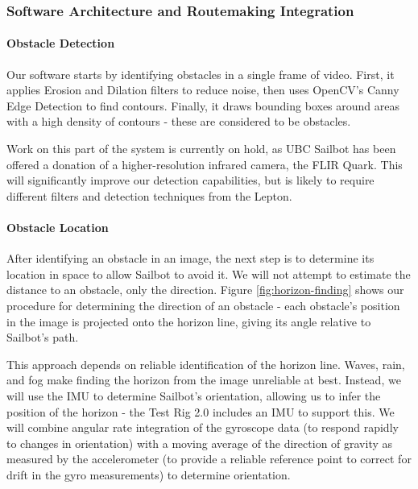 \subsubsection{\label{sec:discussion:equipment:architecture}Software Architecture and Routemaking Integration}

\paragraph{\label{sec:discussion:equipment:architecture:obstacledetection}Obstacle Detection}
Our software starts by identifying obstacles in a single frame of video.  First, it applies Erosion and Dilation filters to reduce noise, then uses OpenCV's Canny Edge Detection to find contours.  Finally, it draws bounding boxes around areas with a high density of contours - these are considered to be obstacles.

Work on this part of the system is currently on hold, as UBC Sailbot has been offered a donation of a higher-resolution infrared camera, the FLIR Quark.  This will significantly improve our detection capabilities, but is likely to require different filters and detection techniques from the Lepton.

\paragraph{\label{sec:discussion:equipment:architecture:obstaclelocation}Obstacle Location}After identifying an obstacle in an image, the next step is to determine its location in space to allow Sailbot to avoid it.  We will not attempt to estimate the distance to an obstacle, only the direction.  Figure \ref{fig:horizon-finding} shows our procedure for determining the direction of an obstacle - each obstacle's position in the image is projected onto the horizon line, giving its angle relative to Sailbot's path.

This approach depends on reliable identification of the horizon line.  Waves, rain, and fog make finding the horizon from the image unreliable at best.  Instead, we will use the IMU to determine Sailbot's orientation, allowing us to infer the position of the horizon - the Test Rig 2.0 includes an IMU to support this.  We will combine angular rate integration of the gyroscope data (to respond rapidly to changes in orientation) with a moving average of the direction of gravity as measured by the accelerometer (to provide a reliable reference point to correct for drift in the gyro measurements) to determine orientation.

